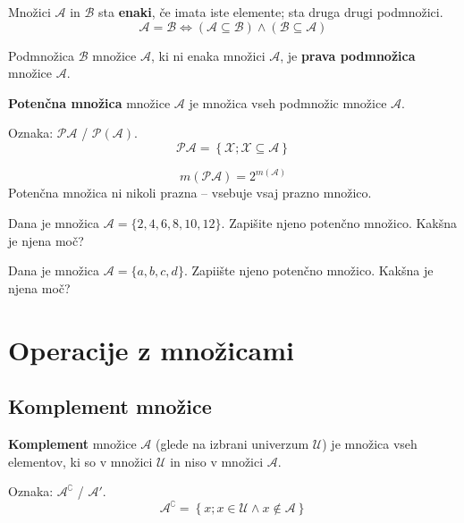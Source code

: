     
            Množici $\mathcal{A}$ in $\mathcal{B}$ sta \textbf{enaki}, če imata iste elemente; 
            sta druga drugi podmnožici.
            $$\mathcal{A}=\mathcal{B}\Leftrightarrow(\mathcal{A}\subseteq\mathcal{B})\land(\mathcal{B}\subseteq\mathcal{A})$$

            Podmnožica $\mathcal{B}$ množice $\mathcal{A}$, ki ni enaka množici $\mathcal{A}$, 
            je \textbf{prava podmnožica} množice $\mathcal{A}$.
            \newline

            \textbf{Potenčna množica} množice $\mathcal{A}$ je množica vseh podmnožic množice $\mathcal{A}$.
            
            Oznaka: $\mathbf{\mathcal{P}\mathcal{A}}$ / $\mathbf{\mathcal{P}(\mathcal{A})}$.
            $$ \mathcal{PA}=\left\{\mathcal{X}; \mathcal{X}\subseteq\mathcal{A} \right\}$$
        

            $$ m(\mathcal{PA})=2^{m(\mathcal{A})}$$
            Potenčna množica ni nikoli prazna -- vsebuje vsaj prazno množico.
    
    
            \begin{naloga}
                Dana je množica $\mathcal{A}=\{2,4,6,8,10,12\}$. Zapišite njeno potenčno množico. 
                Kakšna je njena moč?
            \end{naloga}

            \begin{naloga}
                Dana je množica $\mathcal{A}=\{a,b,c,d\}$. Zapiište njeno potenčno množico. 
                Kakšna je njena moč?
            \end{naloga}

        \section{Operacije z množicami}

        \subsection{Komplement množice}
        
                    \textbf{Komplement} množice $\mathcal{A}$ (glede na izbrani univerzum $\mathcal{U}$) je množica 
                    vseh elementov, ki so v množici $\mathcal{U}$ in niso v množici $\mathcal{A}$.

                    Oznaka: $\mathbf{\mathcal{A}^\complement}$ / $\mathbf{\mathcal{A}'}$.      
                    $$ \mathcal{A}^\complement=\left\{ x; x\in\mathcal{U}\land x\notin\mathcal{A}\right\} $$           
                

